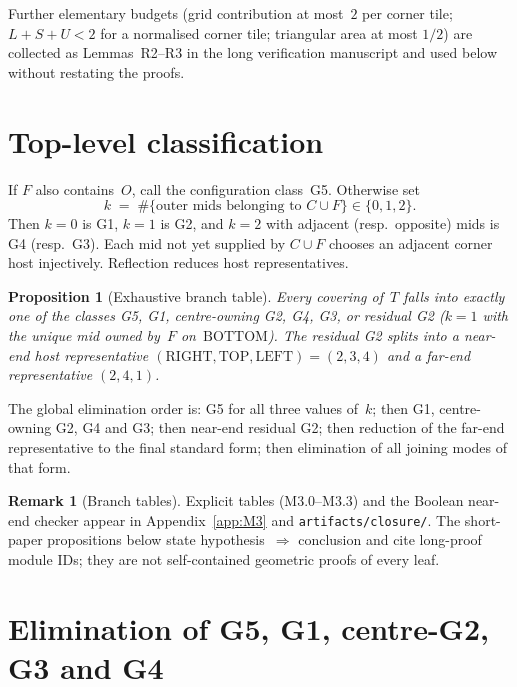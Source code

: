 \documentclass[11pt,reqno]{amsart}
\newtheorem{proposition}[theorem]{Proposition}
\theoremstyle{definition}
\newtheorem{remark}[theorem]{Remark}
\newcommand{\BOTTOM}{\mathrm{BOTTOM}}
\newcommand{\RIGHT}{\mathrm{RIGHT}}
\newcommand{\TOP}{\mathrm{TOP}}
\newcommand{\LEFT}{\mathrm{LEFT}}
\begin{document}
Further elementary budgets (grid contribution at most~$2$ per corner tile;
$L+S+U<2$ for a normalised corner tile; triangular area at most $1/2$) are
collected as Lemmas~R2--R3 in the long verification manuscript and used below
without restating the proofs.

\section{Top-level classification}\label{sec:class}

If $F$ also contains~$O$, call the configuration class~G5.  Otherwise set
\begin{equation}\label{eq:M5}
k \;=\; \#\{\text{outer mids belonging to }C\cup F\}\in\{0,1,2\}.
\end{equation}
Then $k=0$ is G1, $k=1$ is G2, and $k=2$ with adjacent (resp.\ opposite) mids
is G4 (resp.\ G3).  Each mid not yet supplied by $C\cup F$ chooses an adjacent
corner host injectively.  Reflection reduces host representatives.

\begin{proposition}[Exhaustive branch table]\label{prop:M3}
Every covering of~$T$ falls into exactly one of the classes
G5, G1, centre-owning G2, G4, G3, or residual G2
($k=1$ with the unique mid owned by~$F$ on~$\BOTTOM$).
The residual G2 splits into a near-end host representative
$(\RIGHT,\TOP,\LEFT)=(2,3,4)$ and a far-end representative $(2,4,1)$.
\end{proposition}

The global elimination order is: G5 for all three values of~$k$; then G1,
centre-owning G2, G4 and G3; then near-end residual G2; then reduction of the
far-end representative to the final standard form; then elimination of all
joining modes of that form.

\begin{remark}[Branch tables]
Explicit tables (M3.0--M3.3) and the Boolean near-end checker appear in
Appendix~\ref{app:M3} and \texttt{artifacts/closure/}.  The short-paper
propositions below state hypothesis~$\Rightarrow$ conclusion and cite
long-proof module IDs; they are not self-contained geometric proofs of every
leaf.
\end{remark}

\section{Elimination of G5, G1, centre-G2, G3 and G4}\label{sec:early}
\end{document}
